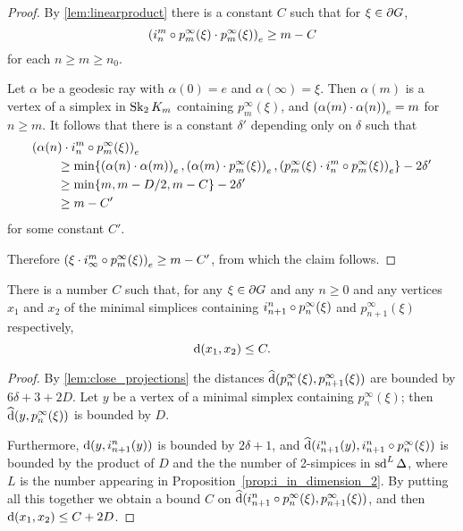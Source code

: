 \documentclass[a4paper]{article}
\begin{document}
\begin{proof}
  By \cref{lem:linearproduct} there is a constant $C$ such that  for $\xi \in
  \boundary G$,
  \begin{equation*}
    \gromov{e}{i^m_n\composed p^\infty_m(\xi)}{p^\infty_m(\xi)} \geq m - C
  \end{equation*} 
  for each $n\geq m\geq n_0$. 

  Let $\alpha$ be a geodesic ray with $\alpha(0) = e$ and $\alpha(\infty) = 
  \xi$. Then $\alpha(m)$ is a vertex of a simplex in $\Skel_2K_m$ containing 
  $p^\infty_m(\xi)$, and $\gromov{e}{\alpha(m)}{\alpha(n)} = m$ for $n\geq m$.
  It follows that there is a constant $\delta'$ depending only on $\delta$ such 
  that
  \begin{align*}
    \mathrlap{\gromov{e}{\alpha(n)}{i^m_n\composed p^\infty_m(\xi)}}\quad\quad &\\
          & \geq \min\{\gromov{e}{\alpha(n)}{\alpha(m)}, 
            \gromov{e}{\alpha(m)}{p^\infty_m(\xi)}, 
            \gromov{e}{p^\infty_m(\xi)}{i^m_n\composed p^\infty_m(\xi)}\} 
            - 2\delta' \\
          &\geq \min\{m, m - D/2, m - C\} - 2\delta' \\
          &\geq m - C'
  \end{align*}
  for some constant $C'$.

  Therefore $\gromov{e}{\xi}{i^m_\infty\composed p^\infty_m(\xi)} \geq m - C'$, 
  from which the claim follows.
\end{proof}

\begin{lemma}\label{lem:name_this}
  There is a number $C$ such that, for any $\xi \in \boundary G$ and any $n
  \geq 0$ and any vertices $x_1$ and $x_2$ of the minimal simplices containing
  $i^n_{n+1}\composed p^\infty_n(\xi)$ and $p^\infty_{n+1}(\xi)$ respectively,
  \begin{equation*}
    \dist(x_1, x_2) \leq C.
  \end{equation*}
\end{lemma}

\begin{proof}
  By \cref{lem:close_projections} the distances $\newdist(p^\infty_n(\xi),
  p^\infty_{n+1}(\xi))$ are bounded by $6\delta + 3 + 2D$. Let $y$ be a vertex
  of a minimal simplex containing $p^\infty_n(\xi)$; then $\newdist(y,
  p^\infty_n(\xi))$ is bounded by $D$.
  
  Furthermore, $\dist(y, i^n_{n+1}(y))$ is bounded by $2\delta+1$, and
  $\newdist(i^n_{n+1}(y), i^n_{n+1}\composed p^\infty_n (\xi))$ is bounded by
  the product of $D$ and the the number of 2-simpices in $\sd^L\Delta$, where
  $L$ is the number appearing in Proposition~\ref{prop:i_in_dimension_2}.  By
  putting all this together we obtain a bound $C$ on
  $\newdist(i^n_{n+1}\composed p^\infty_n(\xi), p^\infty_{n+1}(\xi))$, and then
  $\dist(x_1, x_2) \leq C + 2D$.
\end{proof}
\end{document}
